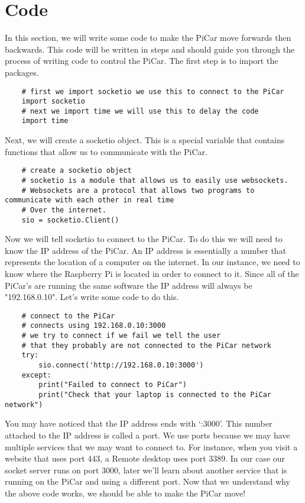\documentclass[11pt]{report}
\begin{document}
\section{Code}
In this section, we will write some code to make the PiCar move forwards then backwards. This code will be written in steps and should guide you through the process of writing code to control the PiCar. The first step is to import the packages.
\begin{verbatim}
    # first we import socketio we use this to connect to the PiCar
    import socketio 
    # next we import time we will use this to delay the code
    import time
\end{verbatim}

Next, we will create a socketio object. This is a special variable that contains functions that allow us to communicate with the PiCar.

\begin{verbatim}
    # create a socketio object
    # socketio is a module that allows us to easily use websockets.
    # Websockets are a protocol that allows two programs to communicate with each other in real time
    # Over the internet. 
    sio = socketio.Client()
    \end{verbatim}

Now we will tell socketio to connect to the PiCar. To do this we will need to know the IP address of the PiCar. An IP address is essentially a number that represents the location of a computer on the internet. In our instance, we need to know where the Raspberry Pi is located in order to connect to it. Since all of the PiCar's are running the same software the IP address will always be "192.168.0.10". Let's write some code to do this.

\begin{verbatim}
    # connect to the PiCar
    # connects using 192.168.0.10:3000
    # we try to connect if we fail we tell the user 
    # that they probably are not connected to the PiCar network
    try:
        sio.connect('http://192.168.0.10:3000')
    except:
        print("Failed to connect to PiCar")
        print("Check that your laptop is connected to the PiCar network")
    \end{verbatim}

You may have noticed that the IP address ends with ‘:3000’. This number attached to the IP address is called a port. We use ports because we may have multiple services that we may want to connect to. For instance, when you visit a website that uses port 443, a Remote desktop uses port 3389. In our case our socket server runs on port 3000, later we'll learn about another service that is running on the PiCar and using a different port. Now that we understand why the above code works, we should be able to make the PiCar move!
\end{document}
